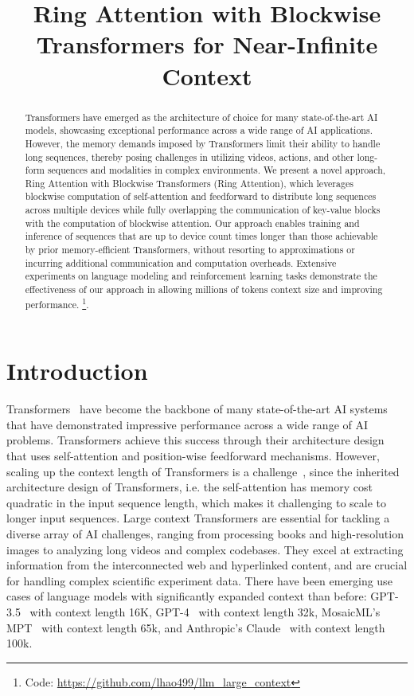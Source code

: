 \title{Ring Attention with Blockwise Transformers for Near-Infinite Context}

\begin{abstract}
Transformers have emerged as the architecture of choice for many state-of-the-art AI models, showcasing exceptional performance across a wide range of AI applications. However, the memory demands imposed by Transformers limit their ability to handle long sequences, thereby posing challenges in utilizing videos, actions, and other long-form sequences and modalities in complex environments. We present a novel approach, Ring Attention with Blockwise Transformers (Ring Attention), which leverages blockwise computation of self-attention and feedforward to distribute long sequences across multiple devices while fully overlapping the communication of key-value blocks with the computation of blockwise attention. Our approach enables training and inference of sequences that are up to device count times longer than those achievable by prior memory-efficient Transformers, without resorting to approximations or incurring additional communication and computation overheads. Extensive experiments on language modeling and reinforcement learning tasks demonstrate the effectiveness of our approach in allowing millions of tokens context size and improving performance.
\footnote{\scriptsize{Code: \url{https://github.com/lhao499/llm_large_context}}}.
\end{abstract}

\section{Introduction}
Transformers~\citep{vaswani2017attention} have become the backbone of many state-of-the-art AI systems that have demonstrated impressive performance across a wide range of AI problems. Transformers achieve this success through their architecture design that uses self-attention and position-wise feedforward mechanisms. However, scaling up the context length of Transformers is a challenge~\citep{openai2023gpt4}, since the inherited architecture design of Transformers, i.e. the self-attention has memory cost quadratic in the input sequence length, which makes it challenging to scale to longer input sequences. Large context Transformers are essential for tackling a diverse array of AI challenges, ranging from processing books and high-resolution images to analyzing long videos and complex codebases. They excel at extracting information from the interconnected web and hyperlinked content, and are crucial for handling complex scientific experiment data. There have been emerging use cases of language models with significantly expanded context than before: GPT-3.5~\citep{schulman2022chatgpt} with context length 16K, GPT-4~\citep{openai2023gpt4} with context length 32k, MosaicML’s MPT~\citep{mosaicml-mpt-7b} with context length 65k, and Anthropic’s Claude~\citep{anthropic-claude} with context length 100k.

